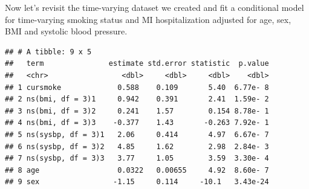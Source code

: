 \documentclass[
]{book}
\newenvironment{Shaded}{\begin{snugshade}}{\end{snugshade}}
\newcommand{\DataTypeTok}[1]{\textcolor[rgb]{0.13,0.29,0.53}{#1}}
\newcommand{\DecValTok}[1]{\textcolor[rgb]{0.00,0.00,0.81}{#1}}
\newcommand{\FloatTok}[1]{\textcolor[rgb]{0.00,0.00,0.81}{#1}}
\newcommand{\KeywordTok}[1]{\textcolor[rgb]{0.13,0.29,0.53}{\textbf{#1}}}
\newcommand{\NormalTok}[1]{#1}
\newcommand{\OperatorTok}[1]{\textcolor[rgb]{0.81,0.36,0.00}{\textbf{#1}}}
\newcommand{\StringTok}[1]{\textcolor[rgb]{0.31,0.60,0.02}{#1}}
\begin{document}
Now let's revisit the time-varying dataset we created and fit a conditional model for time-varying smoking status and MI hospitalization adjusted for age, sex, BMI and systolic blood pressure.

\begin{Shaded}
\end{Shaded}

\begin{verbatim}
## # A tibble: 9 x 5
##   term               estimate std.error statistic  p.value
##   <chr>                 <dbl>     <dbl>     <dbl>    <dbl>
## 1 cursmoke             0.588    0.109       5.40  6.77e- 8
## 2 ns(bmi, df = 3)1     0.942    0.391       2.41  1.59e- 2
## 3 ns(bmi, df = 3)2     0.241    1.57        0.154 8.78e- 1
## 4 ns(bmi, df = 3)3    -0.377    1.43       -0.263 7.92e- 1
## 5 ns(sysbp, df = 3)1   2.06     0.414       4.97  6.67e- 7
## 6 ns(sysbp, df = 3)2   4.85     1.62        2.98  2.84e- 3
## 7 ns(sysbp, df = 3)3   3.77     1.05        3.59  3.30e- 4
## 8 age                  0.0322   0.00655     4.92  8.60e- 7
## 9 sex                 -1.15     0.114     -10.1   3.43e-24
\end{verbatim}

\begin{Shaded}
\end{Shaded}
\end{document}
